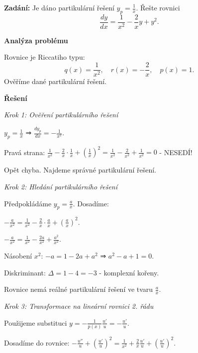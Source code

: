 \vspace{2\baselineskip}

\begin{example}
\label{ex:b1-stredni-spravne-partikularni}

\noindent\textbf{Zadání:} Je dáno partikulární řešení $y_p = \frac{1}{x}$. Řešte rovnici
\[
\frac{dy}{dx} = \frac{1}{x^2} - \frac{2}{x}y + y^2.
\]

\vspace{1.5\baselineskip}

\noindent\textbf{Analýza problému}

\noindent Rovnice je Riccatiho typu:
\[
q(x) = \frac{1}{x^2}, \quad r(x) = -\frac{2}{x}, \quad p(x) = 1.
\]
Ověříme dané partikulární řešení.

\vspace{1.5\baselineskip}

\noindent\textbf{Řešení}

\noindent\textit{Krok 1: Ověření partikulárního řešení}

$y_p = \frac{1}{x}$ ⇒ $\frac{dy_p}{dx} = -\frac{1}{x^2}$.

Pravá strana: $\frac{1}{x^2} - \frac{2}{x}\cdot\frac{1}{x} + \left(\frac{1}{x}\right)^2 = \frac{1}{x^2} - \frac{2}{x^2} + \frac{1}{x^2} = 0$ - NESEDÍ!

Opět chyba. Najdeme správné partikulární řešení.

\noindent\textit{Krok 2: Hledání partikulárního řešení}

Předpokládáme $y_p = \frac{a}{x}$. Dosadíme:

$-\frac{a}{x^2} = \frac{1}{x^2} - \frac{2}{x}\cdot\frac{a}{x} + \left(\frac{a}{x}\right)^2$.

$-\frac{a}{x^2} = \frac{1}{x^2} - \frac{2a}{x^2} + \frac{a^2}{x^2}$.

Násobení $x^2$: $-a = 1 - 2a + a^2$ ⇒ $a^2 - a + 1 = 0$.

Diskriminant: $\Delta = 1 - 4 = -3$ - komplexní kořeny.

Rovnice nemá reálné partikulární řešení ve tvaru $\frac{a}{x}$.

\noindent\textit{Krok 3: Transformace na lineární rovnici 2. řádu}

Použijeme substituci $y = -\frac{1}{p(x)}\frac{u'}{u} = -\frac{u'}{u}$.

Dosadíme do rovnice: $-\frac{u''}{u} + \left(\frac{u'}{u}\right)^2 = \frac{1}{x^2} + \frac{2}{x}\frac{u'}{u} + \left(\frac{u'}{u}\right)^2$.


\end{example}
